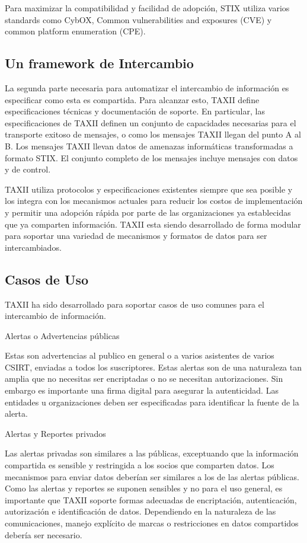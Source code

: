 Para maximizar la compatibilidad y facilidad de adopción, STIX utiliza varios 
standards como CybOX, Common vulnerabilities and exposures (CVE) y common 
platform enumeration (CPE).

\subsection{Un framework de Intercambio}
La segunda parte necesaria para automatizar el intercambio de información es 
especificar como esta es compartida. Para alcanzar esto, TAXII define 
especificaciones técnicas y documentación de soporte. En particular, las 
especificaciones de TAXII definen un conjunto de capacidades necesarias para el 
transporte exitoso de mensajes, o como los mensajes TAXII llegan del punto A al 
B. Los mensajes TAXII llevan datos de amenazas informáticas transformadas a 
formato STIX. El conjunto completo de los mensajes incluye mensajes con datos y 
de control.

TAXII utiliza protocolos y especificaciones existentes siempre que sea posible y 
los integra con los mecanismos actuales para reducir los costos de 
implementación y permitir una adopción rápida por parte de las organizaciones ya 
establecidas que ya comparten información. TAXII esta siendo desarrollado de 
forma modular para soportar una variedad de mecanismos y formatos de datos para 
ser intercambiados.

\subsection{Casos de Uso}
TAXII ha sido desarrollado para soportar casos de uso comunes para el 
intercambio de información.

Alertas o Advertencias públicas

Estas son advertencias al publico en general o a varios asistentes de varios 
CSIRT, enviadas a todos los suscriptores.
Estas alertas son de una naturaleza tan amplia que no necesitas ser encriptadas 
o no se necesitan autorizaciones. Sin embargo es importante una firma digital  
para asegurar la autenticidad. Las entidades u organizaciones deben ser 
especificadas para identificar la fuente de la alerta.

Alertas y Reportes privados

Las alertas privadas son similares a las públicas, exceptuando que la 
información compartida es sensible y restringida a los socios que comparten 
datos. Los mecanismos para enviar datos deberían ser similares a los de las 
alertas públicas. Como las alertas y reportes se suponen sensibles y no para el 
uso general, es importante que TAXII soporte formas adecuadas de encriptación, 
autenticación, autorización e identificación de datos. Dependiendo en la 
naturaleza de las comunicaciones, manejo explícito de marcas o restricciones 
en datos compartidos debería ser necesario.

